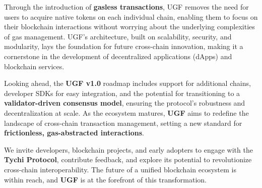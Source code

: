 \documentclass{article}
\begin{document}
Through the introduction of \textbf{gasless transactions}, UGF removes the need for users to acquire native tokens on each individual chain, enabling them to focus on their blockchain interactions without worrying about the underlying complexities of gas management. UGF's architecture, built on scalability, security, and modularity, lays the foundation for future cross-chain innovation, making it a cornerstone in the development of decentralized applications (dApps) and blockchain services.

Looking ahead, the \textbf{UGF v1.0} roadmap includes support for additional chains, developer SDKs for easy integration, and the potential for transitioning to a \textbf{validator-driven consensus model}, ensuring the protocol’s robustness and decentralization at scale. As the ecosystem matures, \textbf{UGF} aims to redefine the landscape of cross-chain transaction management, setting a new standard for \textbf{frictionless, gas-abstracted interactions}.

We invite developers, blockchain projects, and early adopters to engage with the \textbf{Tychi Protocol}, contribute feedback, and explore its potential to revolutionize cross-chain interoperability. The future of a unified blockchain ecosystem is within reach, and \textbf{UGF} is at the forefront of this transformation.
\end{document}
